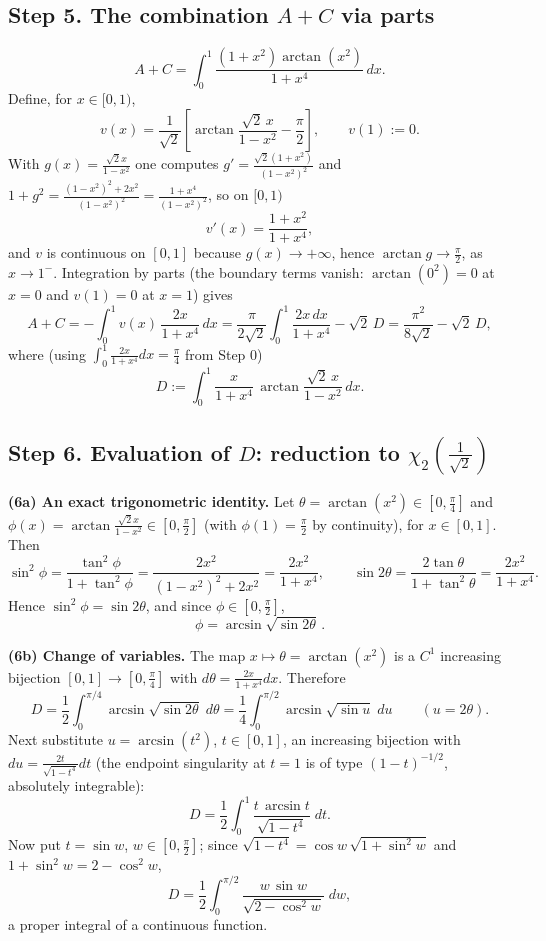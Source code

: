 \documentclass[11pt]{article}
\theoremstyle{remark}
\begin{document}
\subsection*{Step 5. The combination $A+C$ via parts}

\[A+C=\int_0^1\frac{(1+x^2)\arctan(x^2)}{1+x^4}\,dx .\]
Define, for $x\in[0,1)$,
\[v(x)=\frac{1}{\sqrt2}\left[\arctan\frac{\sqrt2\,x}{1-x^2}-\frac\pi2\right],\qquad v(1):=0 .\]
With $g(x)=\frac{\sqrt2 x}{1-x^2}$ one computes $g'=\frac{\sqrt2(1+x^2)}{(1-x^2)^2}$ and $1+g^2=\frac{(1-x^2)^2+2x^2}{(1-x^2)^2}=\frac{1+x^4}{(1-x^2)^2}$, so on $[0,1)$
\[v'(x)=\frac{1+x^2}{1+x^4},\]
and $v$ is continuous on $[0,1]$ because $g(x)\to+\infty$, hence $\arctan g\to\frac\pi2$, as $x\to1^-$. Integration by parts (the boundary terms vanish: $\arctan(0^2)=0$ at $x=0$ and $v(1)=0$ at $x=1$) gives
\begin{equation*}
A+C=-\int_0^1 v(x)\,\frac{2x}{1+x^4}\,dx
=\frac{\pi}{2\sqrt2}\int_0^1\frac{2x\,dx}{1+x^4}-\sqrt2\,D
=\frac{\pi^2}{8\sqrt2}-\sqrt2\,D, \tag{5}
\end{equation*}
where (using $\int_0^1\frac{2x}{1+x^4}dx=\frac\pi4$ from Step 0)
\[D:=\int_0^1\frac{x}{1+x^4}\,\arctan\frac{\sqrt2\,x}{1-x^2}\,dx .\]

\subsection*{Step 6. Evaluation of $D$: reduction to $\chi_2\!\left(\frac{1}{\sqrt2}\right)$}

\textbf{(6a) An exact trigonometric identity.} Let $\theta=\arctan(x^2)\in[0,\frac\pi4]$ and
$\phi(x)=\arctan\frac{\sqrt2 x}{1-x^2}\in[0,\frac\pi2]$ (with $\phi(1)=\frac\pi2$ by continuity), for $x\in[0,1]$. Then
\[\sin^2\phi=\frac{\tan^2\phi}{1+\tan^2\phi}
=\frac{2x^2}{(1-x^2)^2+2x^2}=\frac{2x^2}{1+x^4},
\qquad
\sin 2\theta=\frac{2\tan\theta}{1+\tan^2\theta}=\frac{2x^2}{1+x^4}.\]
Hence $\sin^2\phi=\sin2\theta$, and since $\phi\in[0,\frac\pi2]$,
\[\phi=\arcsin\sqrt{\sin 2\theta}\,. \]

\textbf{(6b) Change of variables.} The map $x\mapsto\theta=\arctan(x^2)$ is a $C^1$ increasing bijection $[0,1]\to[0,\frac\pi4]$ with $d\theta=\frac{2x}{1+x^4}dx$. Therefore
\[D=\frac12\int_0^{\pi/4}\arcsin\sqrt{\sin2\theta}\;d\theta
=\frac14\int_0^{\pi/2}\arcsin\sqrt{\sin u}\;du \qquad(u=2\theta).\]
Next substitute $u=\arcsin(t^2)$, $t\in[0,1]$, an increasing bijection with $du=\frac{2t}{\sqrt{1-t^4}}dt$ (the endpoint singularity at $t=1$ is of type $(1-t)^{-1/2}$, absolutely integrable):
\[D=\frac12\int_0^1\frac{t\,\arcsin t}{\sqrt{1-t^4}}\;dt .\]
Now put $t=\sin w$, $w\in[0,\frac\pi2]$; since $\sqrt{1-t^4}=\cos w\,\sqrt{1+\sin^2w}$ and $1+\sin^2w=2-\cos^2w$,
\[D=\frac12\int_0^{\pi/2}\frac{w\,\sin w}{\sqrt{2-\cos^2w}}\;dw ,\]
a proper integral of a continuous function.
\end{document}

